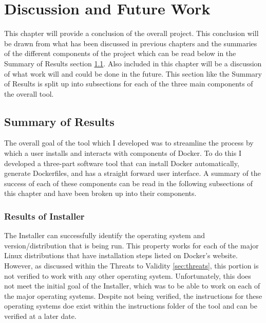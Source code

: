 \chapter{Discussion and Future Work}
\label{ch:conclusion}

%

This chapter will provide a conclusion of the overall project. This conclusion will be drawn from what has been discussed in previous chapters and the summaries of the different components of the project which can be read below in the Summary of Results section \ref{sec:summary}. Also included in this chapter will be a discussion of what work will and could be done in the future. This section like the Summary of Results is split up into subsections for each of the three main components of the overall tool.

\break

\section{Summary of Results}
\label{sec:summary}

The overall goal of the tool which I developed was to streamline the process by which a user installs and interacts with components of Docker. To do this I developed a three-part software tool that can install Docker automatically, generate Dockerfiles, and has a straight forward user interface. A summary of the success of each of these components can be read in the following subsections of this chapter and have been broken up into their components.

\subsection{Results of Installer}
\label{sec:installerResults}

The Installer can successfully identify the operating system and version/distribution that is being run. This property works for each of the major Linux distributions that have installation steps listed on Docker's website. However, as discussed within the Threats to Validity \ref{sec:threats}, this portion is not verified to work with any other operating system. Unfortunately, this does not meet the initial goal of the Installer, which was to be able to work on each of the major operating systems. Despite not being verified, the instructions for these operating systems doe exist within the instructions folder of the tool and can be verified at a later date.

